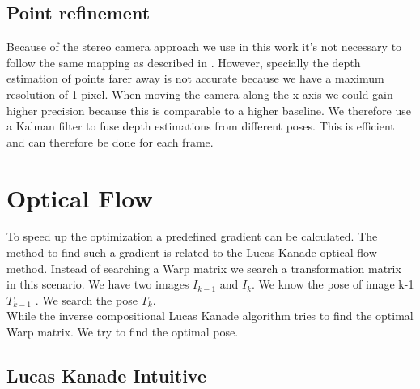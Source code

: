 \documentclass[11pt,a4paper,titlepage,oneside]{report}
\begin{document}
\subsection{Point refinement}
Because of the stereo camera approach we use in this work it's not necessary to follow the same mapping as described in \cite{svo2}. However, specially the depth estimation of points farer away is not accurate because we have a maximum resolution of 1 pixel. When moving the camera along the x axis we could gain higher precision because this is comparable to a higher baseline. We therefore use a Kalman filter to fuse depth estimations from different poses. This is efficient and can therefore be done for each frame. 

\section{Optical Flow}
To speed up the optimization a predefined gradient can be calculated. The method to find such a gradient is related to the Lucas-Kanade optical flow method. Instead of searching a Warp matrix we search a transformation matrix in this scenario. We have two images $I_{k-1}$ and $I_{k}$. We know the pose of image k-1 $T_{k-1}$ . We search the pose $T_k$.\\
While the inverse compositional Lucas Kanade algorithm tries to find the optimal Warp matrix. We try to find the optimal pose.
\subsection{Lucas Kanade Intuitive}
\end{document}

